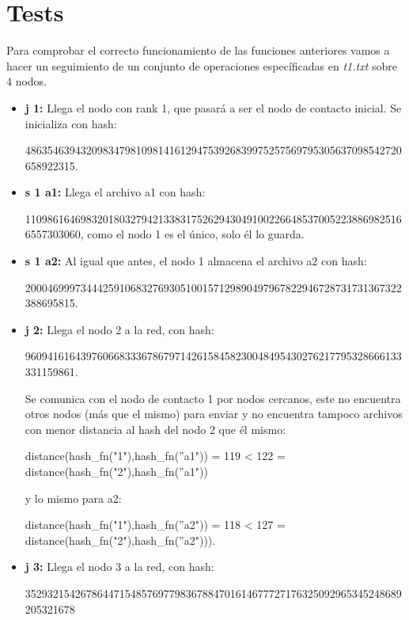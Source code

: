 \section{Tests}

Para comprobar el correcto funcionamiento de las funciones anteriores vamos a hacer un seguimiento de un conjunto de operaciones específicadas en \emph{t1.txt} sobre 4 nodos.

\begin{itemize}
    \item \textbf{j 1:} Llega el nodo con rank 1, que pasará a ser el nodo de contacto inicial.
        Se inicializa con hash:

        48635463943209834798109814161294753926839975257569795305637098542720658922315.

    \item \textbf{s 1 a1:} Llega el archivo a1 con hash:

        110986164698320180327942133831752629430491002266485370052238869825166557303060,
        como el nodo 1 es el único, solo él lo guarda.

    \item \textbf{s 1 a2:} Al igual que antes, el nodo 1 almacena el archivo a2 con hash:

        20004699973444259106832769305100157129890497967822946728731731367322388695815.

    \item \textbf{j 2:} Llega el nodo 2 a la red, con hash:

        96094161643976066833367867971426158458230048495430276217795328666133331159861.

        Se comunica con el nodo de contacto 1 por nodos cercanos, este no encuentra
        otros nodos (más que el mismo) para enviar y no encuentra tampoco archivos con
        menor distancia al hash del nodo 2 que él mismo:

        distance(hash\_fn("1"),hash\_fn(''a1")) = 119 < 122 = distance(hash\_fn("2"),hash\_fn(''a1"))

        y lo mismo para a2:

        distance(hash\_fn("1"),hash\_fn(''a2")) = 118 < 127 = distance(hash\_fn("2"),hash\_fn(''a2"))).

    \item \textbf{j 3:} Llega el nodo 3 a la red, con hash:

        35293215426786447154857697798367884701614677727176325092965345248689205321678


\end{itemize}
